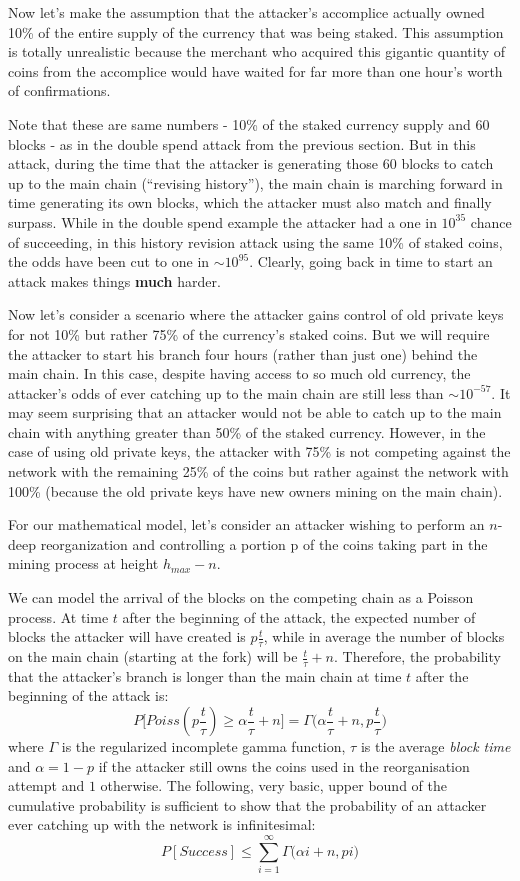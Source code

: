 \documentclass[a4paper,11pt]{article}
\begin{document}
Now let's make the assumption that the attacker's accomplice actually owned 10\% of the entire supply of the currency that was being staked. This assumption is totally unrealistic because the merchant who acquired this gigantic quantity of coins from the accomplice would have waited for far more than one hour's worth of confirmations. 

Note that these are same numbers - 10\% of the staked currency supply and 60 blocks - as in the double spend attack from the previous section. But in this attack, during the time that the attacker is generating those 60 blocks to catch up to the main chain (``revising history''), the main chain is marching forward in time generating its own blocks, which the attacker must also match and finally surpass. While in the double spend example the attacker had a one in $10^{35}$ chance of succeeding, in this history revision attack using the same 10\% of staked coins, the odds have been cut to one in $\sim10^{95}$. Clearly, going back in time to start an attack makes things \textbf{much} harder.
 
Now let's consider a scenario where the attacker gains control of old private keys for not 10\% but rather 75\% of the currency's staked coins. But we will require the attacker to start his branch four hours (rather than just one) behind the main chain. In this case, despite having access to so much old currency, the attacker's odds of ever catching up to the main chain are still less than $\sim10^{-57}$. It may seem surprising that an attacker would not be able to catch up to the main chain with anything greater than 50\% of the staked currency. However, in the case of using old private keys, the attacker with 75\% is not competing against the network with the remaining 25\% of the coins but rather against the network with 100\% (because the old private keys have new owners mining on the main chain).

 
For our mathematical model, let's consider an attacker wishing to perform an $n$-deep reorganization and controlling a portion p of the coins taking part in the mining process at height $h_{max}-n$.

We can model the arrival of the blocks on the competing chain as a Poisson process. At time $t$ after the beginning of the attack, the expected number of blocks the attacker will have created is $p \frac{t}{\tau}$, while in average the number of blocks on the main chain (starting at the fork) will be $\frac{t}{\tau}+n$. Therefore, the probability that the attacker's branch is longer than the main chain at time $t$ after the beginning of the attack is:
$$P\big[ Poiss(p\frac{t}{\tau})\geq \alpha \frac{t}{\tau} +n\big]=\Gamma\big(\alpha \frac{t}{\tau} +n,p\frac{t}{\tau}\big)$$
where $\Gamma$ is the regularized incomplete gamma function, $\tau$ is the average \textit{block time} and $\alpha=1-p$ if the attacker still owns the coins used in the reorganisation attempt and $1$ otherwise.
\newpage
The following, very basic, upper bound of the cumulative probability is sufficient to show that the probability of an attacker ever catching up with the network is infinitesimal:
$$P[Success]\leq \sum\limits_{i=1}^\infty \Gamma\big(\alpha i+n,pi)$$ 
\end{document}
